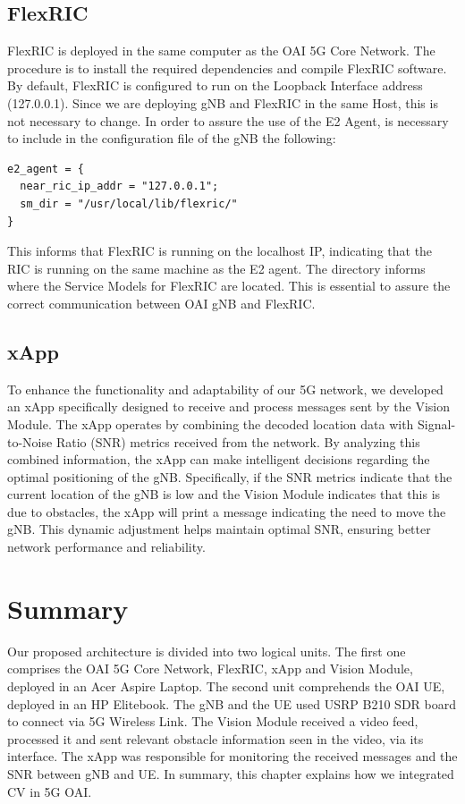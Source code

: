 \subsection{FlexRIC}\label{subsec:flexric}
FlexRIC is deployed in the same computer as the OAI 5G Core Network.
The procedure is to install the required dependencies and compile FlexRIC software.
By default, FlexRIC is configured to run on the Loopback Interface address (127.0.0.1).
Since we are deploying gNB and FlexRIC in the same Host, this is not necessary to change.
In order to assure the use of the E2 Agent, is necessary to include in the configuration file of the gNB the following:

\begin{verbatim}
e2_agent = {
  near_ric_ip_addr = "127.0.0.1";
  sm_dir = "/usr/local/lib/flexric/"
}
\end{verbatim}

This informs that FlexRIC is running on the localhost IP, indicating that the RIC is running on the same machine as the E2 agent.
The directory informs where the Service Models for FlexRIC are located.
This is essential to assure the correct communication between OAI gNB and FlexRIC\@.

\subsection{xApp}\label{subsec:xapp}
To enhance the functionality and adaptability of our 5G network, we developed an xApp specifically designed to receive and process messages sent by the Vision Module.
The xApp operates by combining the decoded location data with Signal-to-Noise Ratio (SNR) metrics received from the network.
By analyzing this combined information, the xApp can make intelligent decisions regarding the optimal positioning of the gNB\@.
Specifically, if the SNR metrics indicate that the current location of the gNB is low and the Vision Module indicates that this is due to obstacles, the xApp will print a message indicating the need to move the gNB.
This dynamic adjustment helps maintain optimal SNR, ensuring better network performance and reliability.


\section{Summary}\label{sec:summary}
Our proposed architecture is divided into two logical units.
The first one comprises the OAI 5G Core Network, FlexRIC, xApp and Vision Module, deployed in an Acer Aspire Laptop.
The second unit comprehends the OAI UE, deployed in an HP Elitebook.
The gNB and the UE used USRP B210 SDR board to connect via 5G Wireless Link.
The Vision Module received a video feed, processed it and sent relevant obstacle information seen in the video, via its interface.
The xApp was responsible for monitoring the received messages and the SNR between gNB and UE\@.
In summary, this chapter explains how we integrated CV in 5G OAI\@.






